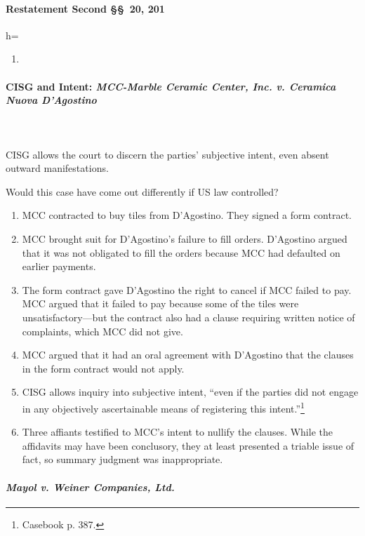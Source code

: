 \paragraph{Restatement Second \S\S\ 20, 201}
h=
\begin{enumerate}
    \item %
\end{enumerate}

\paragraph{CISG and Intent: \emph{MCC-Marble Ceramic Center, Inc. v. 
Ceramica Nuova D'Agostino}}
~\\\\
CISG allows the court to discern the parties' subjective intent, even absent 
outward manifestations.

Would this case have come out differently if US law controlled?

\begin{enumerate}
    \item MCC contracted to buy tiles from D'Agostino. They signed a form 
    contract.
    \item MCC brought suit for D'Agostino's failure to fill orders. D'Agostino 
    argued that it was not obligated to fill the orders because MCC had 
    defaulted on earlier payments.
    \item The form contract gave D'Agostino the right to cancel if MCC failed 
    to pay. MCC argued that it failed to pay because some of the tiles were 
    unsatisfactory---but the contract also had a clause requiring written 
    notice of complaints, which MCC did not give.
    \item MCC argued that it had an oral agreement with D'Agostino that the 
    clauses in the form contract would not apply.
    \item CISG allows inquiry into subjective intent, ``even if the parties 
    did not engage in any objectively ascertainable means of registering this 
    intent.''\footnote{Casebook p. 387.}
    \item Three affiants testified to MCC's intent to nullify the clauses. 
    While the affidavits may have been conclusory, they at least presented a 
    triable issue of fact, so summary judgment was inappropriate.
\end{enumerate}

\paragraph{\emph{Mayol v. Weiner Companies, Ltd.}}

